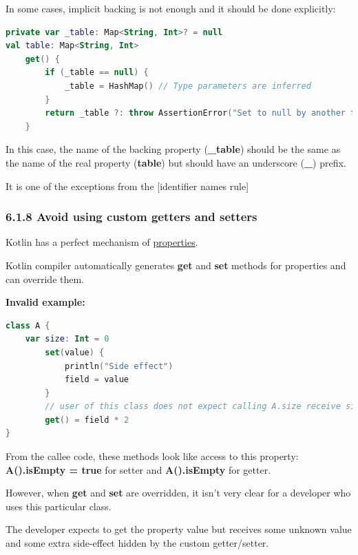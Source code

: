 {{{{{{{{{{{{{{{{{{{{In some cases, implicit backing is not enough and it should be done explicitly:

\begin{lstlisting}[language=Kotlin]
private var _table: Map<String, Int>? = null
val table: Map<String, Int>
    get() {
        if (_table == null) {
            _table = HashMap() // Type parameters are inferred
        }
        return _table ?: throw AssertionError("Set to null by another thread")
    }
\end{lstlisting}


In this case, the name of the backing property (\textbf{\_table}) should be the same as the name of the real property (\textbf{table}) but should have an underscore (\textbf{\_}) prefix.

It is one of the exceptions from the [identifier names rule]



\subsubsection*{\textbf{6.1.8 Avoid using custom getters and setters}}
\leavevmode\newline

\label{sec:6.1.8}

Kotlin has a perfect mechanism of \href{https://kotlinlang.org/docs/reference/properties.html#properties-and-fields}{properties}.

Kotlin compiler automatically generates \textbf{get} and \textbf{set} methods for properties and can override them.



\textbf{Invalid example:}

\begin{lstlisting}[language=Kotlin]
class A {
    var size: Int = 0
        set(value) {
            println("Side effect")
            field = value
        }
        // user of this class does not expect calling A.size receive size * 2 
        get() = field * 2
}
\end{lstlisting}


From the callee code, these methods look like access to this property: \textbf{A().isEmpty = true} for setter and \textbf{A().isEmpty} for getter.



However, when \textbf{get} and \textbf{set} are overridden, it  isn't very clear for a developer who uses this particular class. 

The developer expects to get the property value but receives some unknown value and some extra side-effect hidden by the custom getter/setter. 

}}}}}}}}}}}}}}}}}}}}

